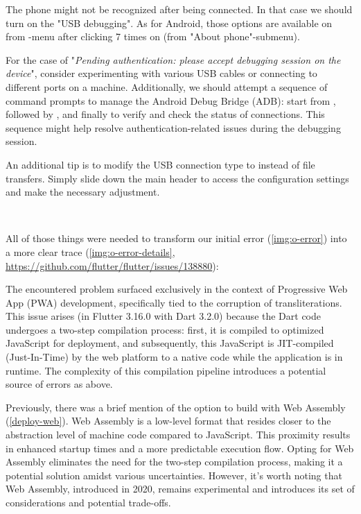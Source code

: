 
\noindent The phone might not be recognized after being connected. In that case we should turn on the "USB debugging".
As for Android, those options are available on  from -menu after clicking 7 times 
on  (from "About phone"-submenu).

For the case of "\emph{Pending authentication: please accept debugging session on the device}", consider experimenting 
with various USB cables or connecting to different ports on a machine. Additionally, we should attempt a sequence of 
command prompts to manage the Android Debug Bridge (ADB): start from , followed by 
, and finally  to verify and check the status of connections. This sequence might 
help resolve authentication-related issues during the debugging session.

An additional tip is to modify the USB connection type to  instead of file transfers. Simply slide down the 
main header to access the configuration settings and make the necessary adjustment.

~

\noindent All of those things were needed to transform our initial error (\cref{img:o-error}) into a more clear trace 
(\cref{img:o-error-details}, 
\href{https://github.com/flutter/flutter/issues/138880}{https://github.com/flutter/flutter/issues/138880}):


\noindent The encountered problem surfaced exclusively in the context of Progressive Web App (PWA) development, 
specifically tied to the corruption of transliterations. This issue arises (in Flutter 3.16.0 with Dart 3.2.0) because 
the Dart code undergoes a two-step compilation process: first, it is compiled to optimized JavaScript for deployment, 
and subsequently, this JavaScript is JIT-compiled (Just-In-Time) by the web platform to a native code while the 
application is in runtime. The complexity of this compilation pipeline introduces a potential source of errors as above.

Previously, there was a brief mention of the option to build with Web Assembly (\ref{deploy-web}). Web Assembly is a 
low-level format that resides closer to the abstraction level of machine code compared to JavaScript. This proximity 
results in enhanced startup times and a more predictable execution flow. Opting for Web Assembly eliminates the need 
for the two-step compilation process, making it a potential solution amidst various uncertainties. However, it's worth 
noting that Web Assembly, introduced in 2020, remains experimental and introduces its set of considerations and 
potential trade-offs.
